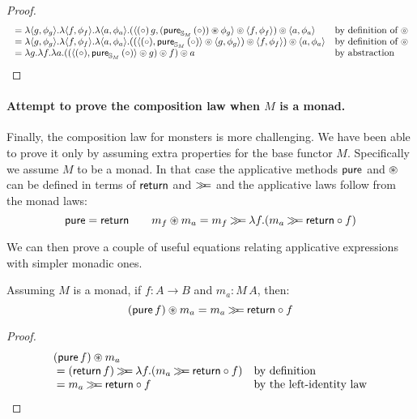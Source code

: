 \begin{lemma}
\begin{proof}
$$\begin{array}{ll}
{}= \lambda \langle g, \phi_g \rangle . \lambda \langle f, \phi_f \rangle . \lambda \langle a, \phi_a \rangle. (\langle (\circ)\, g, (\mathsf{pure}_{\mathbb{S}_{M}}\, (\circ)) \circledast \phi_g \rangle \circledcirc \langle f, \phi_f \rangle) \circledcirc \langle a, \phi_a \rangle
& \mbox{by definition of }\circledcirc \\
{}= \lambda \langle g, \phi_g \rangle . \lambda \langle f, \phi_f \rangle . \lambda \langle a, \phi_a \rangle. ((\langle (\circ), \mathsf{pure}_{\mathbb{S}_{M}}\,(\circ) \rangle \circledcirc \langle g, \phi_g \rangle) \circledcirc \langle f, \phi_f \rangle) \circledcirc \langle a, \phi_a \rangle
& \mbox{by definition of }\circledcirc \\
{}= \lambda g . \lambda f . \lambda a. ((\langle (\circ), \mathsf{pure}_{\mathbb{S}_{M}}\,(\circ) \rangle \circledcirc g) \circledcirc f) \circledcirc a
& \mbox{by abstraction} \\
\end{array}
$$
\end{proof}
\end{lemma}










\paragraph{Attempt to prove the composition law when $M$ is a monad.}

Finally, the composition law for monsters is more challenging.
We have been able to prove it only by assuming extra properties for the base functor $M$.
Specifically we assume $M$ to be a monad.
In that case the applicative methods $\mathsf{pure}$ and $\circledast$ can be defined in terms of $\mathsf{return}$ and $\mathbin{\gg\!\!=}$ and the applicative laws follow from the monad laws:
$$
\mathsf{pure} = \mathsf{return}
\qquad
m_f \circledast m_a = m_f \mathbin{\gg\!\!=} \lambda f. (m_a \mathbin{\gg\!\!=} \mathsf{return}\circ f)
$$

We can then prove a couple of useful equations relating applicative expressions with simpler monadic ones.

\begin{lemma}\label{lemma:pure_app_bind}
Assuming $M$ is a monad, 
if $f:A\rightarrow B$ and $m_a:M\,A$, then:
$$
(\mathsf{pure}\,f)\circledast m_a = m_a \mathbin{\gg\!\!=} \mathsf{return}\circ f
$$
\end{lemma}
\begin{proof}
$$
\begin{array}{ll}
(\mathsf{pure}\,f)\circledast m_a\\
{}= (\mathsf{return}\,f) \mathbin{\gg\!\!=} \lambda f. (m_a \mathbin{\gg\!\!=} \mathsf{return}\circ f)
  & \mbox{by definition}\\
{}= m_a \mathbin{\gg\!\!=} \mathsf{return}\circ f
  & \mbox{by the left-identity law}
\end{array}
$$
\end{proof}

